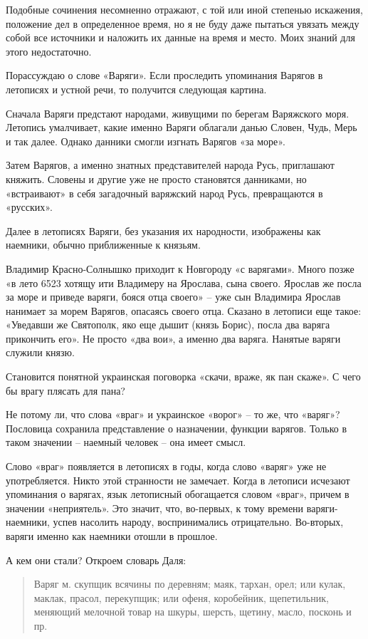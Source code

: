 Подобные сочинения несомненно отражают, с той или иной степенью искажения, положение дел в определенное время, но я не буду даже пытаться увязать между собой все источники и наложить их данные на время и место. Моих знаний для этого недостаточно.

Порассуждаю о слове «Варяги». Если проследить упоминания Варягов в летописях и устной речи, то получится следующая картина.

Сначала Варяги предстают народами, живущими по берегам Варяжского моря. Летопись умалчивает, какие именно Варяги облагали данью Словен, Чудь, Мерь и так далее. Однако данники смогли изгнать Варягов «за море».

Затем Варягов, а именно знатных представителей народа Русь, приглашают княжить. Словены и другие уже не просто становятся данниками, но «встраивают» в себя загадочный варяжский народ Русь, превращаются в «русских».
 
Далее в летописях Варяги, без указания их народности, изображены как наемники, обычно приближенные к князьям.

Владимир Красно-Солнышко приходит к Новгороду «с варягами». Много позже «в лето 6523 хотящу ити Владимеру на Ярослава, сына своего. Ярослав же посла за море и приведе варяги, бояся отца своего» – уже сын Владимира Ярослав нанимает за морем Варягов, опасаясь своего отца. Сказано в летописи еще такое: «Уведавши же Святополк, яко еще дышит (князь Борис), посла два варяга прикончить его». Не просто «два вои», а именно два варяга. Нанятые варяги служили князю.

Становится понятной украинская поговорка «скачи, враже, як пан скаже». С чего бы врагу плясать для пана?

Не потому ли, что слова «враг» и украинское «ворог» – то же, что «варяг»? Пословица сохранила представление о назначении, функции варягов. Только в таком значении – наемный человек – она имеет смысл.

Слово «враг» появляется в летописях в годы, когда слово «варяг» уже не употребляется. Никто этой странности не замечает. Когда в летописи исчезают упоминания о варягах, язык летописный обогащается словом «враг», причем в значении «неприятель». Это значит, что, во-первых, к тому времени варяги-наемники, успев насолить народу, воспринимались отрицательно. Во-вторых, варяги именно как наемники отошли в прошлое.

А кем они стали? Откроем словарь Даля: 

\begin{quotation}
Варяг м. скупщик всячины по деревням; маяк, тархан, орел; или кулак, маклак, прасол, перекупщик; или офеня, коробейник, щепетильник, меняющий мелочной товар на шкуры, шерсть, щетину, масло, посконь и пр.
\end{quotation}

